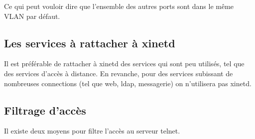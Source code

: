 \documentclass[12pt,a4paper,notitlepage]{article}
\begin{document}
Ce qui peut vouloir dire que l'ensemble des autres ports sont dans le même VLAN par défaut.

\subsection{Les services à rattacher à xinetd}
Il est préférable de rattacher à xinetd des services qui sont peu utilisés, tel que des services d'accès à distance. En revanche, pour des services subissant de nombreuses connections (tel que web, ldap, messagerie) on n'utilisera pas xinetd.

\subsection{Filtrage d'accès}

Il existe deux moyens pour filtre l'accès au serveur telnet.
\end{document}
